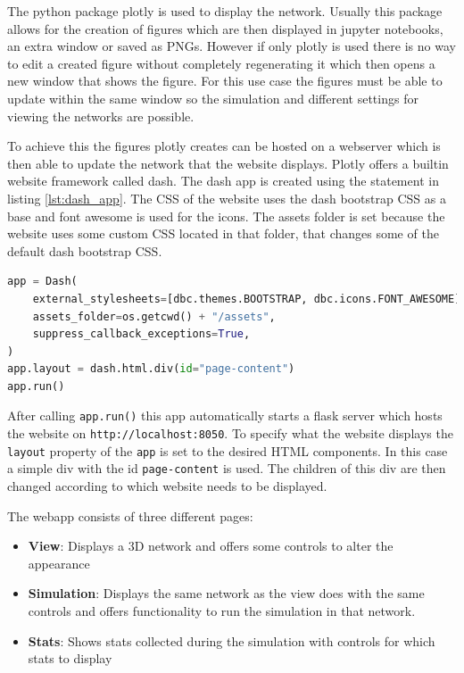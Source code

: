 The python package plotly \cite{plotly} is used to display the network. Usually this 
package allows for the creation of figures which are then displayed in jupyter notebooks,
an extra window or saved as PNGs. However if only plotly is used there is no way to
edit a created figure without completely regenerating it which then opens a new window
that shows the figure. For this use case the figures must be able to update within the 
same window so the simulation and different settings for viewing the networks are possible.

To achieve this the figures plotly creates can be hosted on a webserver which is then
able to update the network that the website displays. Plotly offers a builtin website framework
called dash. The dash app is created using the statement in listing \ref{lst:dash_app}.
The CSS of the website uses the dash bootstrap CSS as a base and font awesome 
\cite{fontAwesome} is used for the icons. The assets folder is set because the website
uses some custom CSS located in that folder, that changes some of the default dash bootstrap CSS.

\begin{lstlisting}[language=python, caption={Instatiate a new Dash app}, label={lst:dash_app}]
app = Dash(
    external_stylesheets=[dbc.themes.BOOTSTRAP, dbc.icons.FONT_AWESOME],
    assets_folder=os.getcwd() + "/assets",
    suppress_callback_exceptions=True,
)
app.layout = dash.html.div(id="page-content")
app.run()
\end{lstlisting}

After calling \texttt{app.run()} this app automatically starts a flask server which hosts 
the website on \texttt{http://localhost:8050}. To specify what the website displays the
\texttt{layout} property of the \texttt{app} is set to the desired HTML components. In this
case a simple div with the id \texttt{page-content} is used. The children of this div
are then changed according to which website needs to be displayed.

The webapp consists of three different pages:
\begin{itemize}
    \item \textbf{View}: Displays a 3D network and offers some controls to alter the appearance
    \item \textbf{Simulation}: Displays the same network as the view does with the same controls and
    offers functionality to run the simulation in that network.
    \item \textbf{Stats}: Shows stats collected during the simulation with controls for which 
    stats to display
\end{itemize}

